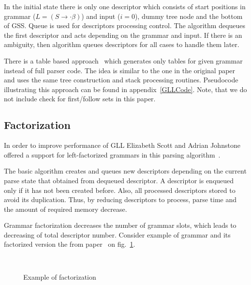 \documentclass[runningheads,a4paper]{llncs}
\begin{document}
In the initial state there is only one descriptor which consists of start positions in grammar ($L = (S \to \cdot \beta)$) and input ($i=0$), dummy tree node and the bottom of GSS.
Queue is used for descriptors processing control.
The algorithm dequeues the first descriptor and acts depending on the grammar and input.
If there is an ambiguity, then algorithm queues descriptors for all cases to handle them later. 

There is a table based approach~\cite{ragozina} which generates only tables for given grammar instead of full parser code.
The idea is similar to the one in the original paper and uses the same tree construction and stack processing routines.
Pseudocode illustrating this approach can be found in appendix~\ref{GLLCode}. Note, that we do not include check for first/follow sets in this paper.


\subsection{Factorization}%

In order to improve performance of GLL Elizabeth Scott and Adrian Johnstone offered a support for left-factorized grammars in this parsing algorithm~\cite{scott2016structuring}. 

The basic algorithm creates and queues new descriptors depending on the current parse state that obtained from dequeued descriptor. 
A descriptor is enqueued only if it has not been created before.
Also, all processed descriptors stored to avoid its duplication.
Thus, by reducing descriptors to process, parse time and the amount of required memory decrease.

Grammar factorization decreases the number of grammar slots, which leads to decreasing of total descriptor number. 
Consider example of grammar and its factorized version the from paper~\cite{scott2016structuring} on fig.~\ref{fig:ExampleOfFactorization}.

\begin{figure}
    \centering
    ~
    \caption{Example of factorization}
    \label{fig:ExampleOfFactorization}
\end{figure}
\end{document}
